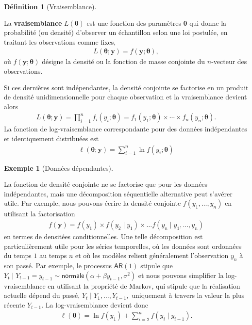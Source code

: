 \documentclass[
  11pt,
  letterpaper,
]{scrbook}
\theoremstyle{plain}
\theoremstyle{plain}
\theoremstyle{definition}
\newtheorem{example}{Exemple}[chapter]
\theoremstyle{definition}
\newtheorem{definition}{Définition}[chapter]
\theoremstyle{remark}
\begin{document}
\begin{definition}[Vraisemblance]\protect\hypertarget{def-vraisemblance}{}\label{def-vraisemblance}

La \textbf{vraisemblance} \(L(\boldsymbol{\theta})\) est une fonction
des paramètres \(\boldsymbol{\theta}\) qui donne la probabilité (ou
densité) d'observer un échantillon selon une loi postulée, en traitant
les observations comme fixes, \begin{align*}
L(\boldsymbol{\theta}; \boldsymbol{y}) = f(\boldsymbol{y}; \boldsymbol{\theta}),
\end{align*} où \(f(\boldsymbol{y}; \boldsymbol{\theta})\) désigne la
densité ou la fonction de masse conjointe du \(n\)-vecteur des
observations.

Si ces dernières sont indépendantes, la densité conjointe se factorise
en un produit de densité unidimensionnelle pour chaque observation et la
vraisemblance devient alors \begin{align*}
L(\boldsymbol{\theta}; \boldsymbol{y})=\prod_{i=1}^n f_i(y_i; \boldsymbol{\theta}) = f_1(y_1; \boldsymbol{\theta}) \times \cdots \times f_n(y_n; \boldsymbol{\theta}).
\end{align*} La fonction de log-vraisemblance correspondante pour des
données indépendantes et identiquement distribuées est \begin{align*}
\ell(\boldsymbol{\theta}; \boldsymbol{y}) = \sum_{i=1}^n \ln f(y_i; \boldsymbol{\theta})
\end{align*}

\end{definition}

\begin{example}[Données
dépendantes]\protect\hypertarget{exm-markov}{}\label{exm-markov}

La fonction de densité conjointe ne se factorise que pour les données
indépendantes, mais une décomposition séquentielle alternative peut
s'avérer utile. Par exemple, nous pouvons écrire la densité conjointe
\(f(y_1, \ldots, y_n)\) en utilisant la factorisation \begin{align*}
f(\boldsymbol{y}) = f(y_1) \times f(y_2 \mid y_1) \times \ldots f(y_n \mid y_1, \ldots, y_n)
\end{align*} en termes de densitées conditionnelles. Une telle
décomposition est particulièrement utile pour les séries temporelles, où
les données sont ordonnées du temps \(1\) au temps \(n\) et où les
modèles relient généralement l'observation \(y_n\) à son passé. Par
exemple, le processus \(\mathsf{AR}(1)\) stipule que
\(Y_t \mid Y_{t-1}=y_{t-1} \sim \mathsf{normale}(\alpha + \beta y_{t-1}, \sigma^2)\)
et nous pouvons simplifier la log-vraisemblance en utilisant la
propriété de Markov, qui stipule que la réalisation actuelle dépend du
passé, \(Y_t \mid Y_1, \ldots, Y_{t-1},\) uniquement à travers la valeur
la plus récente \(Y_{t-1}.\) La log-vraisemblance devient donc
\begin{align*}
\ell(\boldsymbol{\theta}) = \ln f(y_1) + \sum_{i=2}^n f(y_i \mid y_{i-1}).
\end{align*}

\end{example}
\end{document}
